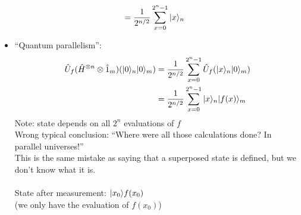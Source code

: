 \documentclass{../doc}
\begin{document}
\begin{itemize}
\begin{align}
          &= \frac{1}{2^{n/2}} \sum_{x=0}^{2^n-1} | x \rangle_n
        \end{align}
      \item ``Quantum parallelism'':
        \begin{align}
          \hat U_f (\hat H^{\otimes n} \otimes \hat 1_m)(| 0 \rangle_n | 0 \rangle_m)
          &= \frac{1}{2^{n/2}} \sum_{x=0}^{2^n-1} \hat U_f(| x \rangle_n | 0 \rangle_m) \\
          &= \frac{1}{2^{n/2}} \sum_{x=0}^{2^n-1} | x \rangle_n | f(x) \rangle_m
        \end{align}
        Note: state depends on all $2^n$ evaluations of $f$ \\
        Wrong typical conclusion: ``Where were all those calculations done? In parallel universes!'' \\
        This is the same mistake as saying that a superposed state is defined, but we don't know what it is. \\\\
        State after measurement: $| x_0 \rangle f(x_0)$ \\
        (we only have the evaluation of $f(x_0)$)
    \end{itemize}
\end{document}
